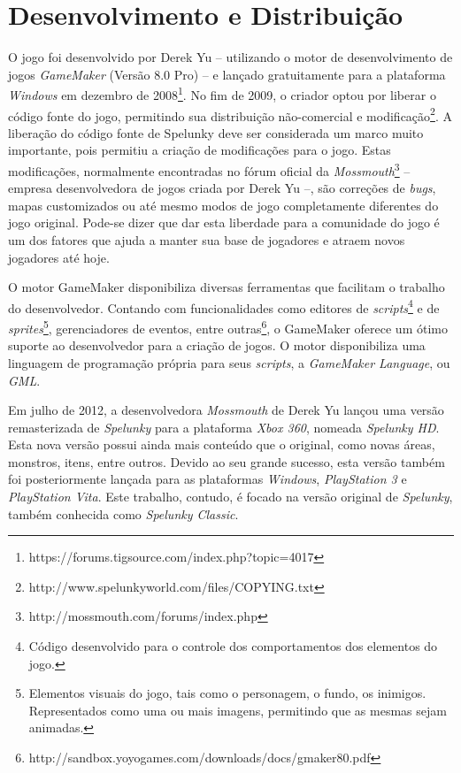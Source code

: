 \section{\label{section:spelunky-dev}Desenvolvimento e Distribuição}
O jogo foi desenvolvido por Derek Yu -- utilizando o motor de desenvolvimento de
jogos \textit{GameMaker} (Versão 8.0 Pro) -- e lançado gratuitamente para a
plataforma \textit{Windows} em dezembro de
2008\footnote{https://forums.tigsource.com/index.php?topic=4017}. No fim de
2009, o criador optou por liberar o código fonte do jogo, permitindo sua
distribuição não-comercial e
modificação\footnote{http://www.spelunkyworld.com/files/COPYING.txt}. A
liberação do código fonte de Spelunky deve ser considerada um marco muito
importante, pois permitiu a criação de modificações para o jogo. Estas
modificações, normalmente encontradas no fórum oficial da
\textit{Mossmouth}\footnote{http://mossmouth.com/forums/index.php} -- empresa
desenvolvedora de jogos criada por Derek Yu --, são correções de \textit{bugs},
mapas customizados ou até mesmo modos de jogo completamente diferentes do jogo
original. Pode-se dizer que dar esta liberdade para a comunidade do jogo é um
dos fatores que ajuda a manter sua base de jogadores e atraem novos jogadores
até hoje.

O motor GameMaker disponibiliza diversas ferramentas que facilitam o trabalho
do desenvolvedor. Contando com funcionalidades como editores de
\textit{scripts}\footnote{Código desenvolvido para o controle dos
comportamentos dos elementos do jogo.} e de \textit{sprites}\footnote{Elementos
visuais do jogo, tais como o personagem, o fundo, os inimigos. Representados
como uma ou mais imagens, permitindo que as mesmas sejam animadas.},
gerenciadores de eventos, entre
outras\footnote{http://sandbox.yoyogames.com/downloads/docs/gmaker80.pdf}, o
GameMaker oferece um ótimo suporte ao desenvolvedor para a criação de jogos. O
motor disponibiliza uma linguagem de programação própria para seus
\textit{scripts}, a \textit{GameMaker Language}, ou \textit{GML}.

Em julho de 2012, a desenvolvedora \textit{Mossmouth} de Derek Yu lançou uma
versão remasterizada de \textit{Spelunky} para a plataforma \textit{Xbox 360},
nomeada \textit{Spelunky HD}. Esta nova versão possui ainda mais conteúdo que o
original, como novas áreas, monstros, itens, entre outros. Devido ao seu grande
sucesso, esta versão também foi posteriormente lançada para as plataformas
\textit{Windows}, \textit{PlayStation 3} e \textit{PlayStation Vita}. Este
trabalho, contudo, é focado na versão original de \textit{Spelunky}, também
conhecida como \textit{Spelunky Classic}.
